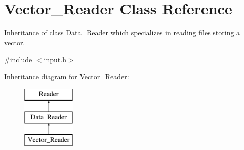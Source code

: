 \hypertarget{class_vector___reader}{}\section{Vector\+\_\+\+Reader Class Reference}
\label{class_vector___reader}


Inheritance of class \mbox{\hyperlink{class_data___reader}{Data\+\_\+\+Reader}} which specializes in reading files storing a vector.  




{\ttfamily \#include $<$input.\+h$>$}

Inheritance diagram for Vector\+\_\+\+Reader\+:\begin{figure}[H]
\begin{center}
\leavevmode
\includegraphics[height=3.000000cm]{class_vector___reader}
\end{center}
\end{figure}
